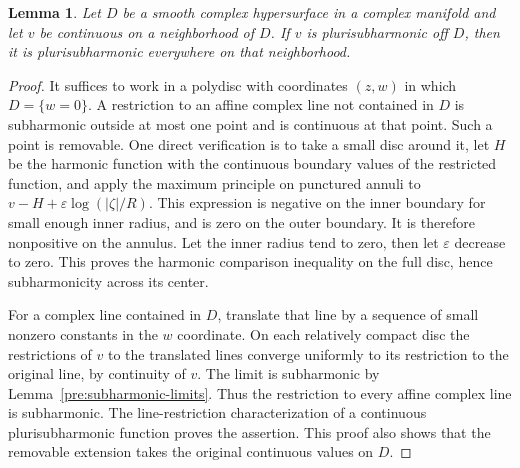 \documentclass[11pt,a4paper]{article}
\numberwithin{equation}{section}
\newtheorem{lemma}[theorem]{Lemma}
\theoremstyle{definition}
\theoremstyle{remark}
\begin{document}
\begin{lemma}\label{pre:removable}
Let $D$ be a smooth complex hypersurface in a complex manifold and let
$v$ be continuous on a neighborhood of $D$. If $v$ is plurisubharmonic
off $D$, then it is plurisubharmonic everywhere on that neighborhood.
\end{lemma}
\begin{proof}
It suffices to work in a polydisc with coordinates $(z,w)$ in which
$D=\{w=0\}$. A restriction to an affine complex line not contained in
$D$ is subharmonic outside at most one point and is continuous at that
point. Such a point is removable. One direct verification is to take
a small disc around it, let $H$ be the harmonic function with the
continuous boundary values of the restricted function, and apply the
maximum principle on punctured annuli to
$v-H+\varepsilon\log(|\zeta|/R)$. This expression is negative on the
inner boundary for small enough inner radius, and is zero on the outer
boundary. It is therefore nonpositive on the annulus. Let the inner
radius tend to zero, then let $\varepsilon$ decrease to zero. This
proves the harmonic comparison inequality on the full disc, hence
subharmonicity across its center.

For a complex line contained in $D$, translate that line by a sequence
of small nonzero constants in the $w$ coordinate. On each relatively
compact disc the restrictions of $v$ to the translated lines converge
uniformly to its restriction to the original line, by continuity of $v$.
The limit is subharmonic by Lemma~\ref{pre:subharmonic-limits}. Thus the
restriction to every affine complex line is subharmonic. The
line-restriction characterization of a continuous plurisubharmonic
function proves the assertion. This proof also shows that the removable
extension takes the original continuous values on $D$.
\end{proof}
\end{document}
